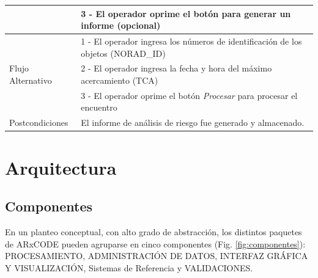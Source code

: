 \begin{table}[h]
{\begin{tabular}[c]{ll}
& 3 - El operador oprime el bot\'on para generar un informe (opcional)\\
\hline
\multirow{ 3}{*}{Flujo Alternativo} & 1 - El operador ingresa los n\'umeros de identificaci\'on de los objetos (NORAD\_ID) \\
& 2 - El operador ingresa la fecha y hora del m\'aximo acercamiento (TCA)\\
& 3 - El operador oprime el bot\'on {\it{Procesar}} para procesar el encuentro\\
\hline
Postcondiciones & El informe de an\'alisis de riesgo fue generado y almacenado.\\
\hline
\end{tabular}}
\label{tab:usoproceso}
\end{table}


\section{Arquitectura}

\subsection*{Componentes}\label{subsec:componentes}
En un planteo conceptual, con alto grado de abstracci\'on, los distintos paquetes de ARxCODE pueden agruparse en cinco componentes (Fig.  \ref{fig:componentes}): PROCESAMIENTO, ADMINISTRACI\'ON DE DATOS, INTERFAZ GR\'AFICA Y VISUALIZACI\'ON, Sistemas de Referencia y VALIDACIONES.\\

